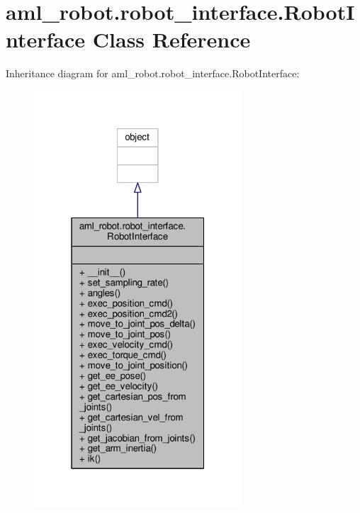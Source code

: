\hypertarget{classaml__robot_1_1robot__interface_1_1_robot_interface}{\section{aml\-\_\-robot.\-robot\-\_\-interface.\-Robot\-Interface Class Reference}
\label{classaml__robot_1_1robot__interface_1_1_robot_interface}
}


Inheritance diagram for aml\-\_\-robot.\-robot\-\_\-interface.\-Robot\-Interface\-:\nopagebreak
\begin{figure}[H]
\begin{center}
\leavevmode
\includegraphics[width=220pt]{classaml__robot_1_1robot__interface_1_1_robot_interface__inherit__graph}
\end{center}
\end{figure}


